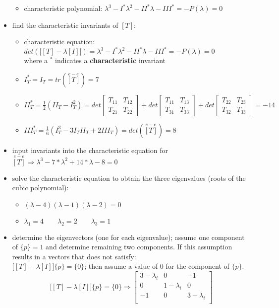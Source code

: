 \documentclass[10pt, letterpaper]{article}
\begin{document}
\begin{itemize}
\begin{itemize}
				\item characteristic polynomial:  $\lambda ^3 - I^* \lambda^2 - II^* \lambda - III^* =- P(\lambda) = 0$
			\end{itemize}
		\item find the characteristic invariants of $[T]$:
			\begin{itemize}
			\item characteristic equation:  $det \left( \Big[ [T] - \lambda [I] \Big] \right) =
				\lambda ^3 - I^* \lambda^2 - II^* \lambda - III^* =- P(\lambda) = 0$ \\
				where a ${}^*$ indicates a \textbf{characteristic} invariant
			\item $I^*_T  = I_T = tr\left( \overset{e-e}{[T]} \right) = 7$
			\item $II^*_T = \frac{1}{2}(II_T - I^2_T) = det \begin{bmatrix}
				T_{11} & T_{12} \\ T_{21} & T_{22} \end{bmatrix} + det \begin{bmatrix}
				T_{11} & T_{13} \\ T_{31} & T_{33} \end{bmatrix} + det \begin{bmatrix}
				T_{22} & T_{23} \\ T_{32} & T_{33} \end{bmatrix} = -14$
			\item $III^*_T = \frac{1}{6}(I^3_T - 3I_T II_T + 2III_T) = det\left(\overset{e-e}{[T]} \right) = 8$
			\end{itemize}
		\item input invariants into the characteristic equation for $\overset{e-e}{[T]} \Rightarrow
				 \lambda^3 - 7*\lambda^2 + 14 *\lambda - 8 = 0$
		\item solve the characteristic equation to obtain the three eigenvalues (roots of the cubic polynomial):
				\begin{itemize}
					\item $(\lambda -4)(\lambda - 1)(\lambda -2) = 0$
					\item$\lambda_1 = 4 \qquad \lambda_2 = 2 \qquad \lambda_3 = 1$
				\end{itemize}
		\item determine the eigenvectors (one for each eigenvalue); assume one component of $\{p\} = 1$ and determine
		 	remaining two components.  If this assumption results in a vectors that does not satisfy:   \\
			$\Big[ [T] - \lambda [I] \Big] \{p\} = \{0\}$; then assume a value of 0 for the component of $\{p\}$.
			 \begin{equation*} \Big[ [T] - \lambda [I] \Big] \{p\} = \{0\} \Rightarrow
			 \begin{bmatrix} 
				3 - \lambda_i & 0 &-1 \\ 0 & 1- \lambda_i & 0 \\ -1 & 0 & 3 -\lambda_i \\


\end{bmatrix}
\end{equation*}
\end{itemize}
\end{document}
